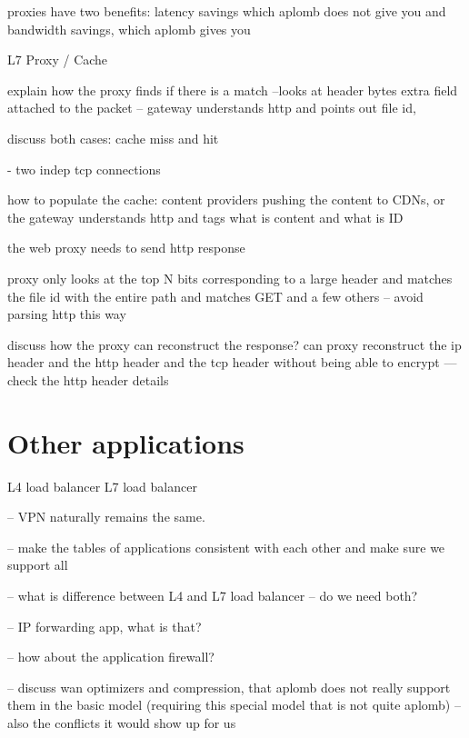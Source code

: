proxies have two benefits: latency savings which aplomb does not give you 
and bandwidth savings, which aplomb gives you
 
L7 Proxy / Cache

explain how the proxy finds if there is  a match --looks at header bytes
extra field attached to the packet -- gateway understands http and points out file id, 

discuss both cases: cache miss and hit

- two indep tcp connections 

how to populate the cache: content providers pushing the content to CDNs, or the gateway understands
http and tags what is content and what is ID

the web proxy needs to send http response 

proxy only looks at the top N bits corresponding to a large header and matches the file id with the entire path
and matches GET and a few others -- avoid parsing http this way


discuss how the proxy can reconstruct the response?
can proxy reconstruct the ip header and the http header  and the tcp header without being able to encrypt
--- check the http header details


\section{Other applications}\label{sec:vpn} \label{sec:other} \label{sec:not_supp}\label{sec:loadb}


L4 load balancer
L7 load balancer

-- VPN naturally remains the same. 

-- make the tables of applications consistent with each other and make sure we support all 

-- what is difference between L4 and L7 load balancer -- do we need both?

-- IP forwarding app, what is that?

-- how about the application firewall?

-- discuss wan optimizers and compression, that aplomb does not really support them in the basic model (requiring this special model that is not quite aplomb) -- also the conflicts it would show up for us